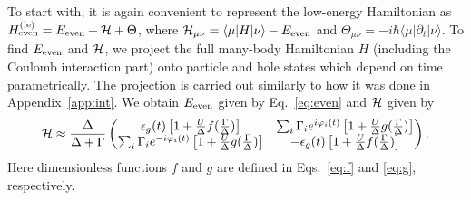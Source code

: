 \documentclass[aps,reprint,longbibliography, prb]{revtex4-2}
\begin{document}
To start with, it is again convenient to represent the low-energy Hamiltonian as $H_\mathrm{even}^{\mathrm{(le)}} = E_{\rm even} + {\cal H} + \Theta$, where ${\cal H}_{\mu\nu} = \langle \mu| H |\nu\rangle - E_{\rm even}$ and $\Theta_{\mu\nu} = -i\hbar \langle \mu | \partial_t | \nu \rangle$. To find $E_{\rm even}$ and ${\cal H}$, we project the full many-body Hamiltonian $H$ (including the Coulomb interaction part) onto particle and hole states which depend on time parametrically. The projection is carried out similarly to how it was done in Appendix~\ref{app:int}. We obtain $E_{\rm even}$ given by Eq.~\eqref{eq:even} and ${\cal H}$ given by
\begin{equation}\label{eq:low-en-ham_int_app}
    {\cal H} \approx \frac{\Delta}{\Delta + \Gamma}
    \begin{pmatrix}
    \epsilon_g(t) \left[1 + \frac{U}{\Delta} f(\frac{\Gamma}{\Delta})\right] & \sum_i \Gamma_i e^{i\varphi_i(t)} \left[1 + \frac{U}{\Delta} g(\frac{\Gamma}{\Delta})\right]\\
    \sum_i \Gamma_i e^{-i\varphi_i(t)} \left[1 + \frac{U}{\Delta} g(\frac{\Gamma}{\Delta})\right] & - \epsilon_g(t) \left[1 + \frac{U}{\Delta} f(\frac{\Gamma}{\Delta})\right]
    \end{pmatrix}.
\end{equation}
Here dimensionless functions $f$ and $g$ are defined in Eqs.~\eqref{eq:f} and \eqref{eq:g}, respectively.
\end{document}
